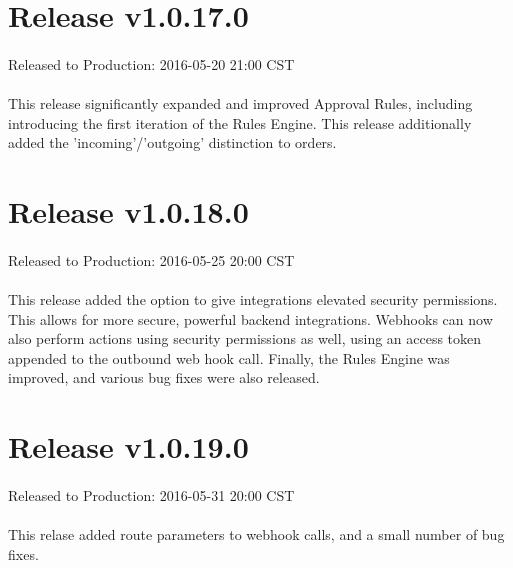 \documentclass{memoir}%
\begin{document}
%
\section*{Release v1.0.17.0}%
\paragraph*{}%
Released to Production: 2016{-}05{-}20 21:00 CST

%
\paragraph*{}%
This release significantly expanded and improved Approval Rules, including introducing the first iteration of the Rules Engine. This release additionally added the 'incoming'/'outgoing' distinction to orders.

%
\section*{Release v1.0.18.0}%
\paragraph*{}%
Released to Production: 2016{-}05{-}25 20:00 CST

%
\paragraph*{}%
This release added the option to give integrations elevated security permissions. This allows for more secure, powerful backend integrations. Webhooks can now also perform actions using security permissions as well, using an access token appended to the outbound web hook call. Finally, the Rules Engine was improved, and various bug fixes were also released.

%
\section*{Release v1.0.19.0}%
\paragraph*{}%
Released to Production: 2016{-}05{-}31 20:00 CST

%
\paragraph*{}%
This relase added route parameters to webhook calls, and a small number of bug fixes.
\end{document}
